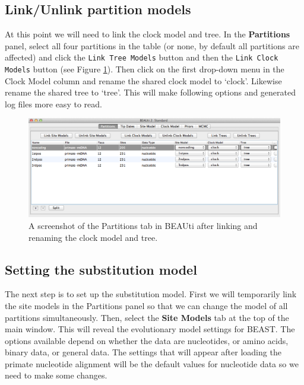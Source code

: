 \documentclass[11pt]{article}
\theoremstyle{plain}%
\theoremstyle{definition}
\theoremstyle{remark}
\begin{document}
%
%

\subsection*{Link/Unlink partition models}

At this point we will need to link the clock model and tree. In the {\bf Partitions} panel, select all four partitions in the table (or none, by default all partitions are affected) and click the \texttt{Link Tree Models} button and then the \texttt{Link Clock Models} button (see Figure \ref{fig:BEAUti_DataPartitions_final}). Then click on the first drop-down menu in the Clock Model column and rename the shared clock model to `clock'. Likewise rename the shared tree to `tree'. This will make following options and generated log files more easy to read.

\begin{figure}

\includegraphics[width=\textwidth]{figures/BEAUti_DataPartitions_final}
\caption{A screenshot of the Partitions tab in BEAUti after linking and renaming the clock model and tree.}
\label{fig:BEAUti_DataPartitions_final}
\end{figure}

\subsection{Setting the substitution model}

The next step is to set up the substitution model. First we will temporarily link the site models in the Partitions panel so that we can change the model of all partitions simultaneously. Then, select the {\bf Site Models} tab at the top of the
main window. This will reveal the evolutionary model settings for
BEAST. The options available depend on whether the data are
nucleotides, or amino acids, binary data, or general data.
The settings that will appear after loading the primate nucleotide alignment will
be the default values for nucleotide data so we need to make some changes. 
\end{document}
